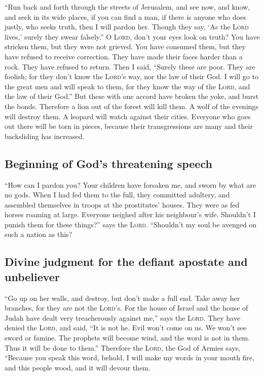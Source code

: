  ``Run back and forth through the streets of Jerusalem,
and see now, and know, and seek in its wide places, if you can find a
man, if there is anyone who does justly, who seeks truth, then I will
pardon her.  Though they say, `As the \textsc{Lord}
lives,' surely they swear falsely.''  O \textsc{Lord},
don't your eyes look on truth? You have stricken them, but they were not
grieved. You have consumed them, but they have refused to receive
correction. They have made their faces harder than a rock. They have
refused to return.  Then I said, ``Surely these are poor.
They are foolish; for they don't know the \textsc{Lord}'s way, nor the
law of their God.  I will go to the great men and will
speak to them, for they know the way of the \textsc{Lord}, and the law
of their God.'' But these with one accord have broken the yoke, and
burst the bonds.  Therefore a lion out of the forest will
kill them. A wolf of the evenings will destroy them. A leopard will
watch against their cities. Everyone who goes out there will be torn in
pieces, because their transgressions are many and their backsliding has
increased.

\hypertarget{beginning-of-gods-threatening-speech}{%
\subsection{Beginning of God's threatening
speech}\label{beginning-of-gods-threatening-speech}}

 ``How can I pardon you? Your children have forsaken me,
and sworn by what are no gods. When I had fed them to the full, they
committed adultery, and assembled themselves in troops at the
prostitutes' houses.  They were as fed horses roaming at
large. Everyone neighed after his neighbour's wife. 
Shouldn't I punish them for these things?'' says the \textsc{Lord}.
``Shouldn't my soul be avenged on such a nation as this?

\hypertarget{divine-judgment-for-the-defiant-apostate-and-unbeliever}{%
\subsection{Divine judgment for the defiant apostate and
unbeliever}\label{divine-judgment-for-the-defiant-apostate-and-unbeliever}}

 ``Go up on her walls, and destroy, but don't make a full
end. Take away her branches, for they are not the \textsc{Lord}'s.
 For the house of Israel and the house of Judah have
dealt very treacherously against me,'' says the \textsc{Lord}.
 They have denied the \textsc{Lord}, and said, ``It is
not he. Evil won't come on us. We won't see sword or famine.
 The prophets will become wind, and the word is not in
them. Thus it will be done to them.''  Therefore the
\textsc{Lord}, the God of Armies says, ``Because you speak this word,
behold, I will make my words in your mouth fire, and this people wood,
and it will devour them.

